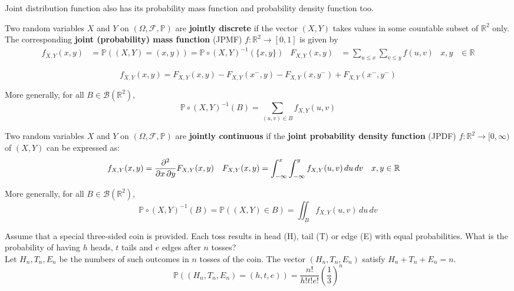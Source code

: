 \documentclass{huhtakm-template-book}
\newcommand{\prob}{\mathbb{P}}
\begin{document}
    Joint distribution function also has its probability mass function and probability density function too.
    \begin{defn}
        Two random variables $X$ and $Y$ on $(\Omega,\mathcal{F},\prob)$ are \textbf{jointly discrete} if the vector $(X,Y)$ takes values in some countable subset of $\mathbb{R}^{2}$ only. The corresponding \textbf{joint (probability) mass function} (JPMF) $f:\mathbb{R}^{2}\to [0,1]$ is given by
        \begin{align*}
            f_{X,Y}(x,y)&=\prob((X,Y)=(x,y))=\prob\circ(X,Y)^{-1}(\{x,y\}) & F_{X,Y}(x,y)&=\sum_{u\leq x}\sum_{v\leq y}f(u,v) & x,y&\in\mathbb{R}
        \end{align*}
    \end{defn}
    \begin{rem}
        \begin{equation*}
            f_{X,Y}(x,y)=F_{X,Y}(x,y)-F_{X,Y}(x^{-},y)-F_{X,Y}(x,y^{-})+F_{X,Y}(x^{-},y^{-})
        \end{equation*}
    \end{rem}
    \begin{rem}
        More generally, for all $B\in\mathcal{B}(\mathbb{R}^{2})$,
        \begin{equation*}
            \prob\circ(X,Y)^{-1}(B)=\sum_{(u,v)\in B}f_{X,Y}(u,v)
        \end{equation*}
    \end{rem}
    \begin{defn}
        Two random variables $X$ and $Y$ on $(\Omega,\mathcal{F},\prob)$ are \textbf{jointly continuous} if the \textbf{joint probability density function} (JPDF) $f:\mathbb{R}^{2}\to [0,\infty)$ of $(X,Y)$ can be expressed as:
        \begin{align*}
            f_{X,Y}(x,y)&=\pdv*{F_{X,Y}(x,y)}{x,y} & F_{X,Y}(x,y)&=\int_{-\infty}^{x}\int_{-\infty}^{y}f_{X,Y}(u,v)\,du\,dv & x,y&\in\mathbb{R}
        \end{align*}
    \end{defn}
    \begin{rem}
        More generally, for all $B\in\mathcal{B}(\mathbb{R}^{2})$,
        \begin{equation*}
            \prob\circ(X,Y)^{-1}(B)=\prob((X,Y)\in B)=\iint_{B}f_{X,Y}(u,v)\,du\,dv
        \end{equation*}
    \end{rem}
    \begin{eg}
    	Assume that a special three-sided coin is provided. Each toss results in head (H), tail (T) or edge (E) with equal probabilities. What is the probability of having $h$ heads, $t$ tails and $e$ edges after $n$ tosses?\\
    	Let $H_{n},T_{n},E_{n}$ be the numbers of such outcomes in $n$ tosses of the coin. The vector $(H_{n},T_{n},E_{n})$ satisfy $H_{n}+T_{n}+E_{n}=n$.
    	\begin{equation*}
    		\prob((H_{n},T_{n},E_{n})=(h,t,e))=\frac{n!}{h!t!e!}\left(\frac{1}{3}\right)^{n}
    	\end{equation*}
    \end{eg}
\end{document}
